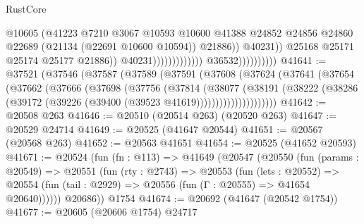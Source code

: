 \begin{lexlean}{RustCore}
\begin{coremodule}
                                                            @10605
                                                            (@41223
                                                              @7210
                                                              @3067
                                                              @10593
                                                              @10600
                                                              @41388
                                                              @24852
                                                              @24856
                                                              @24860
                                                              @22689
                                                              (@21134 (@22691 @10600 @10594))
                                                              @21886))
                                                          @40231))
                                                      @25168
                                                      @25171
                                                      @25174
                                                      @25177
                                                      @21886))
                                                  @40231)))))))))))))
                        @36532))))))))))
@41641 := @37521
    (@37546
      (@37587
        (@37589
          (@37591
            (@37608
              (@37624
                (@37641
                  (@37654
                    (@37662
                      (@37666
                        (@37698
                          (@37756
                            (@37814
                              (@38077
                                (@38191
                                  (@38222
                                    (@38286
                                      (@39172 (@39226 (@39400 (@39523 @41619)))))))))))))))))))))
@41642 := @20508 @263
@41646 := @20510 (@20514 @263) (@20520 @263)
@41647 := @20529 @24714
@41649 := @20525 (@41647 @20544)
@41651 := @20567 (@20568 @263)
@41652 := @20563 @41651
@41654 := @20525 (@41652 @20593)
@41671 := @20524
    (fun (fn : @113) =>
    @41649
      (@20547
        (@20550
          (fun (params : @20549) =>
          @20551
            (fun (rty : @2743) =>
            @20553
              (fun (lets : @20552) =>
              @20554 (fun (tail : @2929) => @20556 (fun (Γ : @20555) => @41654 @20640))))))
        @20686))
    @1754
@41674 := @20692 (@41647 (@20542 @1754))
@41677 := @20605 (@20606 @1754) @24717

\end{coremodule}
\end{lexlean}
